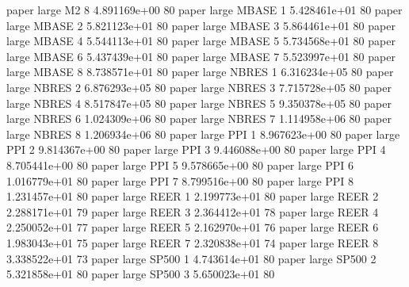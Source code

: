               paper      large       M2                 8 4.891169e+00 80
              paper      large    MBASE                 1 5.428461e+01 80
              paper      large    MBASE                 2 5.821123e+01 80
              paper      large    MBASE                 3 5.864461e+01 80
              paper      large    MBASE                 4 5.544113e+01 80
              paper      large    MBASE                 5 5.734568e+01 80
              paper      large    MBASE                 6 5.437439e+01 80
              paper      large    MBASE                 7 5.523997e+01 80
              paper      large    MBASE                 8 8.738571e+01 80
              paper      large    NBRES                 1 6.316234e+05 80
              paper      large    NBRES                 2 6.876293e+05 80
              paper      large    NBRES                 3 7.715728e+05 80
              paper      large    NBRES                 4 8.517847e+05 80
              paper      large    NBRES                 5 9.350378e+05 80
              paper      large    NBRES                 6 1.024309e+06 80
              paper      large    NBRES                 7 1.114958e+06 80
              paper      large    NBRES                 8 1.206934e+06 80
              paper      large      PPI                 1 8.967623e+00 80
              paper      large      PPI                 2 9.814367e+00 80
              paper      large      PPI                 3 9.446088e+00 80
              paper      large      PPI                 4 8.705441e+00 80
              paper      large      PPI                 5 9.578665e+00 80
              paper      large      PPI                 6 1.016779e+01 80
              paper      large      PPI                 7 8.799516e+00 80
              paper      large      PPI                 8 1.231457e+01 80
              paper      large     REER                 1 2.199773e+01 80
              paper      large     REER                 2 2.288171e+01 79
              paper      large     REER                 3 2.364412e+01 78
              paper      large     REER                 4 2.250052e+01 77
              paper      large     REER                 5 2.162970e+01 76
              paper      large     REER                 6 1.983043e+01 75
              paper      large     REER                 7 2.320838e+01 74
              paper      large     REER                 8 3.338522e+01 73
              paper      large    SP500                 1 4.743614e+01 80
              paper      large    SP500                 2 5.321858e+01 80
              paper      large    SP500                 3 5.650023e+01 80
